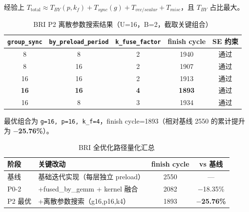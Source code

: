     经验上
    $T_{\text{total}}\approx T_{BY}(p,k_{f}) + T_{sync}(g) + T_{vec/scalar}+ T_{misc}$，且
    $T_{BY}$ 占比最大。

    \begin{table}[H]
        \centering
        \caption{BRI P2 离散参数搜索结果（U=16，B=2，截取关键组合）}
        \begin{tabular}{c c c c c}
            \toprule \texttt{group\_sync} & \texttt{by\_preload\_period} & \texttt{k\_fuse\_factor} & \textbf{finish cycle} & SE 约束 \\
            \midrule 8                    & 8                            & 2                        & 1940                  & 通过    \\
            8                             & 16                           & 2                        & 1907                  & 通过    \\
            16                            & 16                           & 2                        & 1913                  & 通过    \\
            \textbf{16}                   & \textbf{16}                  & \textbf{4}               & \textbf{1893}         & 通过    \\
            16                            & 8                            & 3                        & 1934                  & 通过    \\
            \bottomrule
        \end{tabular}
    \end{table}

    最优组合为 \texttt{g=16, p=16, k\_f=4}，finish cycle=1893（相对基线 2550 的累计提升为
    \textbf{$-$25.76\%}）。

    \begin{table}[H]
        \centering
        \caption{BRI 全优化路径量化汇总}
        \begin{tabular}{p{2.2cm} p{6.8cm} c c}
            \toprule \textbf{阶段} & \textbf{关键改动}                & \textbf{finish cycle} & \textbf{vs 基线}      \\
            \midrule 基线          & 基础迭代实现（每层独立 preload）         & 2550                  & —                   \\
            P0-2                 & +fused\_by\_gemm + kernel 融合 & 2082                  & $-$18.35\%          \\
            P2 最优                & +离散参数搜索（g16,p16,k4）          & 1893                  & \textbf{$-$25.76\%} \\
            \bottomrule
        \end{tabular}
    \end{table}

